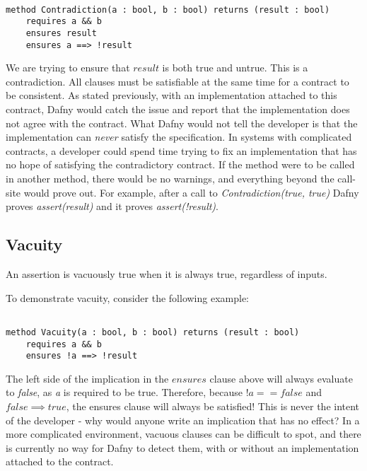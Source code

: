 \documentclass{article}
\newif\ifcomments
\newcommand{\egm}[1]{\ifcomments\textcolor{orange}{egm: #1}\fi}
\newcommand{\cass}[1]{\ifcomments\textcolor{blue}{cass: #1}\fi}
\begin{document}
\begin{lstlisting}[language=dafny]

method Contradiction(a : bool, b : bool) returns (result : bool)
    requires a && b
    ensures result
    ensures a ==> !result

\end{lstlisting}

We are trying to ensure that \(result\) is both true and untrue. This is a contradiction. All clauses must be satisfiable
at the same time for a contract to be consistent. As stated previously, with an implementation attached to this contract,
Dafny would catch the issue and report that the implementation does not agree with the contract. What Dafny would not
tell the developer is that the implementation can {\it never} satisfy the specification. In systems with complicated
contracts, a developer could spend time trying to fix an implementation that has no hope of satisfying the contradictory
contract. If the method were to be called in another method, there would be no warnings, and everything beyond the call-site 
would prove out. For example, after a call to \emph{Contradiction(true, true)} Dafny proves \emph{assert(result)} and it proves \emph{assert(!result)}. 

\egm{For example, after a call to \emph{PostconditionContradiction(true, true)} Dafny proves \emph{assert(result)} and it proves \emph{assert(!result)}. Change the method name to something shorter too so it fits on the line.} 
\cass{Done!}

\subsection{Vacuity}

An assertion is vacuously true when it is always true, regardless of inputs. 

To demonstrate vacuity, consider the following example:

\begin{lstlisting}[language=dafny]

method Vacuity(a : bool, b : bool) returns (result : bool)
    requires a && b
    ensures !a ==> !result

\end{lstlisting}

The left side of the implication in the \(ensures\) clause above will always evaluate to {\it false}, as {\it a} is required to be true. 
Therefore, because \(!a == false\) and \(false \implies true\), the ensures clause will always be satisfied! This is never the intent of the 
developer - why would anyone write an implication that has no effect? In a more complicated environment, vacuous clauses can be difficult to 
spot, and there is currently no way for Dafny to detect them, with or without an implementation attached to
the contract.
\end{document}
